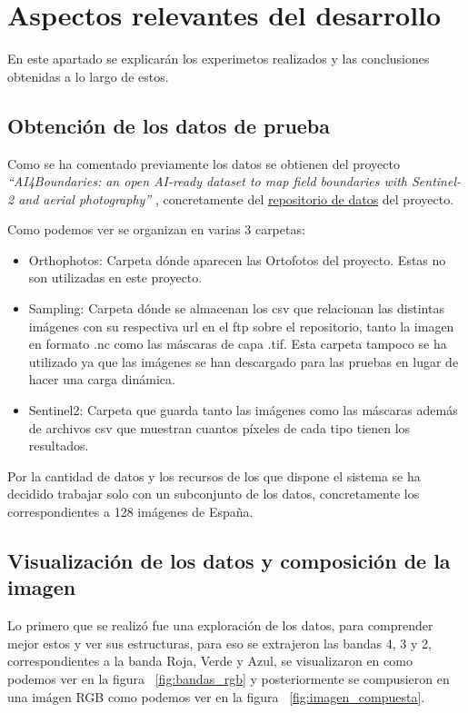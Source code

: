\chapter{Aspectos relevantes del desarrollo}
En este apartado se explicarán los experimetos realizados y las conclusiones obtenidas a lo largo de estos.

\section{Obtención de los datos de prueba}\label{sect:datosPrueba}
Como se ha comentado previamente los datos se obtienen del proyecto \textit{``AI4Boundaries: an open AI-ready dataset to map field boundaries with Sentinel-2 and aerial photography''} \cite{AI4boundaries}, concretamente del  \href{https://jeodpp.jrc.ec.europa.eu/ftp/jrc-opendata/DRLL/AI4BOUNDARIES/}{repositorio de datos} del proyecto.

Como podemos ver se organizan en varias 3 carpetas:

\begin{itemize}
	\item{Orthophotos}: Carpeta dónde aparecen las Ortofotos del proyecto. Estas no son utilizadas en este proyecto.
	\item{Sampling}: Carpeta dónde se almacenan los csv que relacionan las distintas imágenes con su respectiva url en el ftp sobre el repositorio, tanto la imagen en formato .nc como las máscaras de capa .tif. Esta carpeta tampoco se ha utilizado ya que las imágenes se han descargado para las pruebas en lugar de hacer una carga dinámica.
	\item{Sentinel2}: Carpeta que guarda tanto las imágenes como las máscaras además de archivos csv que muestran cuantos píxeles de cada tipo tienen los resultados.
\end{itemize}

Por la cantidad de datos y los recursos de los que dispone el sistema se ha decidido trabajar solo con un subconjunto de los datos, concretamente los correspondientes a 128 imágenes de España.

\section{Visualización de los datos y composición de la imagen}
Lo primero que se realizó fue una exploración de los datos, para comprender mejor estos y ver sus estructuras, para eso se extrajeron las bandas 4, 3 y 2, correspondientes a la banda Roja, Verde y Azul, se visualizaron en como podemos ver en la figura ~\ref{fig:bandas_rgb} y posteriormente se compusieron en una imágen RGB como podemos ver en la figura ~\ref{fig:imagen_compuesta}.

